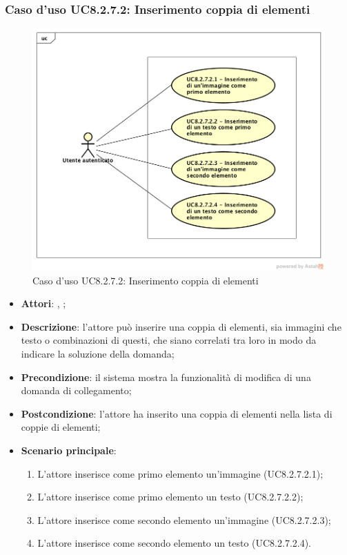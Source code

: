 	\subsubsection{Caso d'uso UC8.2.7.2: Inserimento coppia di elementi}
	\label{UC8.2.7.2}
	\begin{figure}[h]
		\centering
		\includegraphics[scale=0.5,keepaspectratio]{UML/UC8_2_7_2.png}
		\caption{Caso d'uso UC8.2.7.2: Inserimento coppia di elementi}
	\end{figure}
	\FloatBarrier
	\begin{itemize}
		\item \textbf{Attori}: \uau, \uaupro;
		\item \textbf{Descrizione}: l'attore può inserire una coppia di elementi, sia immagini che testo o combinazioni di questi, che siano correlati tra loro in modo da indicare la soluzione della domanda; 
		\item \textbf{Precondizione}: il sistema mostra la funzionalità di modifica di una domanda di collegamento; 
		\item \textbf{Postcondizione}: l'attore ha inserito una coppia di elementi nella lista di coppie di elementi; 
		\item \textbf{Scenario principale}: 
		\begin{enumerate}
			\item L'attore inserisce come primo elemento un'immagine (UC8.2.7.2.1);
			\item L'attore inserisce come primo elemento un testo (UC8.2.7.2.2);
			\item L'attore inserisce come secondo elemento un'immagine (UC8.2.7.2.3);
			\item L'attore inserisce come secondo elemento un testo (UC8.2.7.2.4).	
		\end{enumerate}
	\end{itemize}
	
